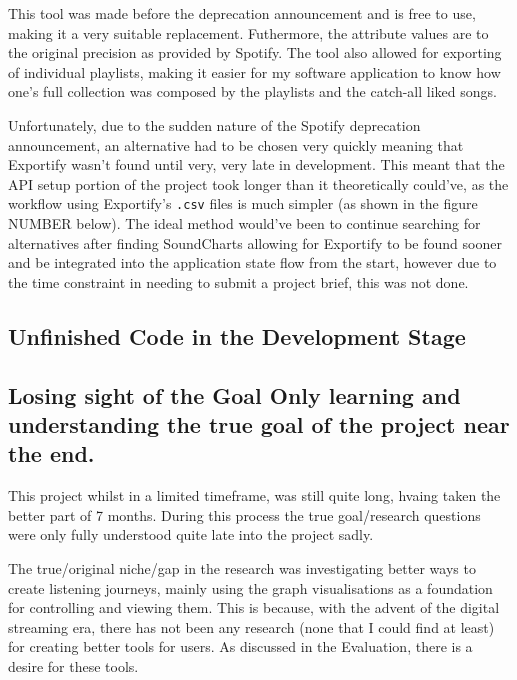 This tool was made before the deprecation announcement and is free to use, making it a very suitable replacement. Futhermore, the attribute values are to the original precision as provided by Spotify. The tool also allowed for exporting of individual playlists, making it easier for my software application to know how one's full collection was composed by the playlists and the catch-all liked songs.

Unfortunately, due to the sudden nature of the Spotify deprecation announcement, an alternative had to be chosen very quickly meaning that Exportify wasn't found until very, very late in development. This meant that the API setup portion of the project took longer than it theoretically could've, as the workflow using Exportify's \lstinline|.csv| files is much simpler (as shown in the figure NUMBER below). The ideal method would've been to continue searching for alternatives after finding SoundCharts allowing for Exportify to be found sooner and be integrated into the application state flow from the start, however due to the time constraint in needing to submit a project brief, this was not done.%

\subsection{Unfinished Code in the Development Stage}

\subsection{
    Losing sight of the Goal
    Only learning and understanding the true goal of the project near the end.
}%

This project whilst in a limited timeframe, was still quite long, hvaing taken the better part of 7 months. During this process the true goal/research questions were only fully understood quite late into the project sadly.

The true/original niche/gap in the research was investigating better ways to create listening journeys, mainly using the graph visualisations as a foundation for controlling and viewing them. This is because, with the advent of the digital streaming era, there has not been any research (none that I could find at least) for creating better tools for users. As discussed in the Evaluation, there is a desire for these tools.

